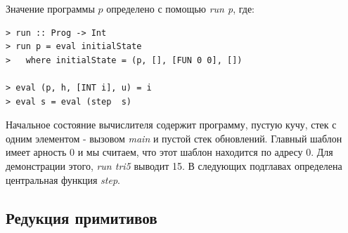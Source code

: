 \documentclass[flenqn, 14pt]{extarticle}
\begin{document}
Значение программы $p$ определено с помощью \textit{run p}, где:
\begin{verbatim}
> run :: Prog -> Int
> run p = eval initialState
>   where initialState = (p, [], [FUN 0 0], [])

> eval (p, h, [INT i], u) = i
> eval s = eval (step  s)
\end{verbatim}

Начальное состояние вычислителя содержит программу, пустую кучу, стек с одним элементом - вызовом \textit{main} и пустой стек обновлений. Главный шаблон имеет арность 0 и мы считаем, что этот шаблон находится по адресу 0. Для демонстрации этого, \textit{run tri5} выводит 15. В следующих подглавах определена центральная функция \textit{step}.

\subsection{Редукция примитивов}
\end{document}
